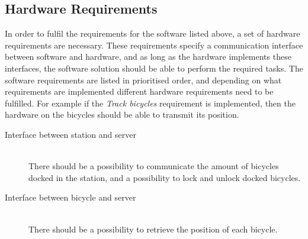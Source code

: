 \subsection{Hardware Requirements}
In order to fulfil the requirements for the software listed above, a set of hardware requirements are necessary.
These requirements specify a communication interface between software and hardware, and as long as the hardware implements these interfaces, the software solution should be able to perform the required tasks.
The software requirements are listed in prioritised order, and depending on what requirements are implemented different hardware requirements need to be fulfilled. 
For example if the \textit{Track bicycles} requirement is implemented, then the hardware on the bicycles should be able to transmit its position.
\begin{description}
	\item[Interface between station and server]\hfill \\
	There should be a possibility to communicate the amount of bicycles docked in the station, and a possibility to lock and unlock docked bicycles.
	\item[Interface between bicycle and server]\hfill \\
	There should be a possibility to retrieve the position of each bicycle.
\end{description}